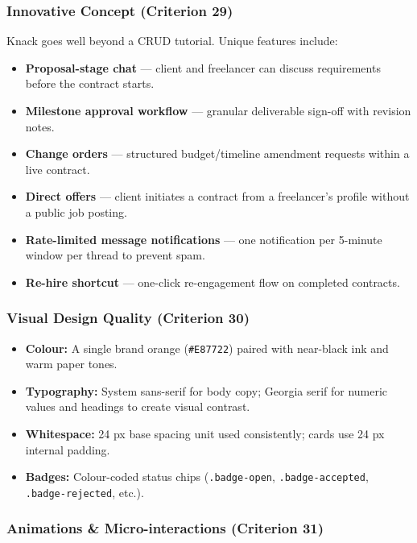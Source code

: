 \documentclass[12pt,a4paper]{article}
\begin{document}
\subsubsection{Innovative Concept (Criterion 29)}

Knack goes well beyond a CRUD tutorial. Unique features include:
\begin{itemize}[noitemsep]
  \item \textbf{Proposal-stage chat} --- client and freelancer can discuss requirements before the contract starts.
  \item \textbf{Milestone approval workflow} --- granular deliverable sign-off with revision notes.
  \item \textbf{Change orders} --- structured budget/timeline amendment requests within a live contract.
  \item \textbf{Direct offers} --- client initiates a contract from a freelancer's profile without a public job posting.
  \item \textbf{Rate-limited message notifications} --- one notification per 5-minute window per thread to prevent spam.
  \item \textbf{Re-hire shortcut} --- one-click re-engagement flow on completed contracts.
\end{itemize}

\subsubsection{Visual Design Quality (Criterion 30)}

\begin{itemize}[noitemsep]
  \item \textbf{Colour:} A single brand orange (\texttt{\#E87722}) paired with near-black ink and warm paper tones.
  \item \textbf{Typography:} System sans-serif for body copy; Georgia serif for numeric values and headings to create visual contrast.
  \item \textbf{Whitespace:} 24 px base spacing unit used consistently; cards use 24 px internal padding.
  \item \textbf{Badges:} Colour-coded status chips (\texttt{.badge-open}, \texttt{.badge-accepted}, \texttt{.badge-rejected}, etc.).
\end{itemize}

\subsubsection{Animations \& Micro-interactions (Criterion 31)}
\end{document}
